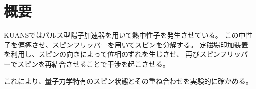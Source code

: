 \section*{概要}
KUANSではパルス型陽子加速器を用いて熱中性子を発生させている。
この中性子を偏極させ、スピンフリッパーを用いてスピンを分解する。
定磁場印加装置を利用し、スピンの向きによって位相のずれを生じさせ、
再びスピンフリッパーでスピンを再結合させることで干渉を起こさせる。

これにより、量子力学特有のスピン状態とその重ね合わせを実験的に確かめる。

